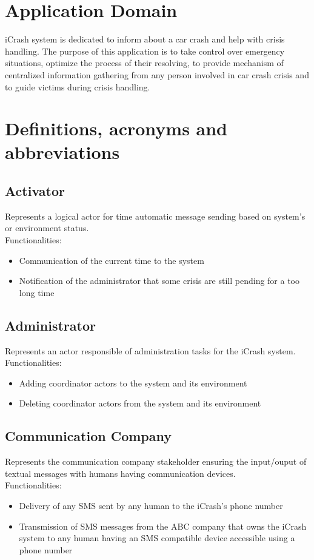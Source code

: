 \section{Application Domain}
iCrash system is dedicated to inform about a car crash and help with crisis
handling. The purpose of this application is to take control over emergency
situations, optimize the process of their resolving, to provide mechanism of
centralized information gathering from any person involved in car crash crisis
and to guide victims during crisis handling.
 
\section{Definitions, acronyms and abbreviations}

\subsection{Activator}
Represents a logical actor for time automatic message sending based on system’s
or environment status.\\
Functionalities:
\begin{itemize}
  \item Communication of the current time to the system
  \item Notification of the administrator that some crisis are still pending for
  a too long time
\end{itemize}

\subsection{Administrator}
Represents an actor responsible of administration tasks for the iCrash system.\\
Functionalities:
\begin{itemize}
  \item Adding coordinator actors to the system and its environment
  \item Deleting coordinator actors from the system and its environment
\end{itemize}

\subsection{Communication Company}
Represents the communication company stakeholder ensuring the input/ouput of
textual messages with humans having communication devices.\\
Functionalities:
\begin{itemize}
  \item Delivery of any SMS sent by any human to the iCrash's phone number
  \item Transmission of SMS messages from the ABC company that owns the iCrash
  system to any human having an SMS compatible device accessible using a phone
  number
\end{itemize}


